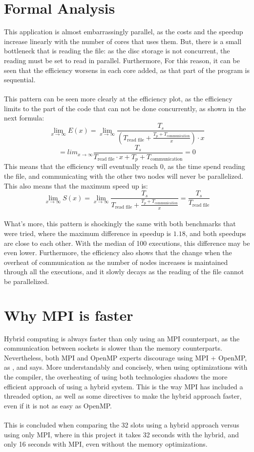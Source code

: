 \documentclass[11pt, a4paper]{article}
\begin{document}
	\section{Formal Analysis}
	This application is almost embarrassingly parallel, as the costs and the speedup increase linearly with the number of cores that uses them. But, there is a small bottleneck that is reading the file: as the disc storage is not concurrent, the reading must be set to read in parallel. Furthermore, For this reason, it can be seen that the efficiency worsens in each core added, as that part of the program is sequential.\\
\\
This pattern can be seen more clearly at the efficiency plot, as the efficiency limits to the part of the code that can not be done concurrently, as shown in the next formula:
\[ \lim_{x \to \infty} E(x) = \lim_{x \to \infty} \frac{T_s} {(T_{\text{read file}} +  \frac{T_p + T_\text{communication}} x ) \cdot x} \]
\[= lim_{x \to \infty}\frac{T_s}{T_\text{read file} \cdot x + T_p + T_{\text{communication}}} = 0\]
This means that the efficiency will eventually reach 0, as the time spend reading the file, and communicating with the other two nodes will never be parallelized. This also means that the maximum speed up is:
\[ \lim_{x \to \infty} S(x) = \lim_{x \to \infty} \frac{T_s}{T_{\text{read file}} + \frac{T_p + T_\text{communication}}x} = \frac{T_s}{T_\text{read file}}\]
\\
What's more, this pattern is shockingly the same with both benchmarks that were tried, where the maximum difference in speedup is $1.18$, and both speedups are close to each other. With the median of 100 executions, this difference may be even lower. Furthermore, the efficiency also shows that the change when the overheat of communication as the number of nodes increases is maintained through all the executions, and it slowly decays as the reading of the file cannot be parallelized. 

\section{Why MPI is faster}
Hybrid computing is always faster than only using an MPI counterpart, as the communication between sockets is slower than the memory counterparts. Nevertheless, both MPI and OpenMP experts discourage using MPI + OpenMP, as \cite{openmp}, and \cite{article} says. More understandably and concisely, when using optimizations with the compiler, the overheating of using both technologies shadows the more efficient approach of using a hybrid system. This is the way MPI has included a threaded option, as well as some directives to make the hybrid approach faster, even if it is not as easy as OpenMP.\\
\\
This is concluded when comparing the 32 slots using a hybrid approach versus using only MPI, where in this project it takes 32 seconds with the hybrid, and only 16 seconds with MPI, even without the memory optimizations.
\end{document}
